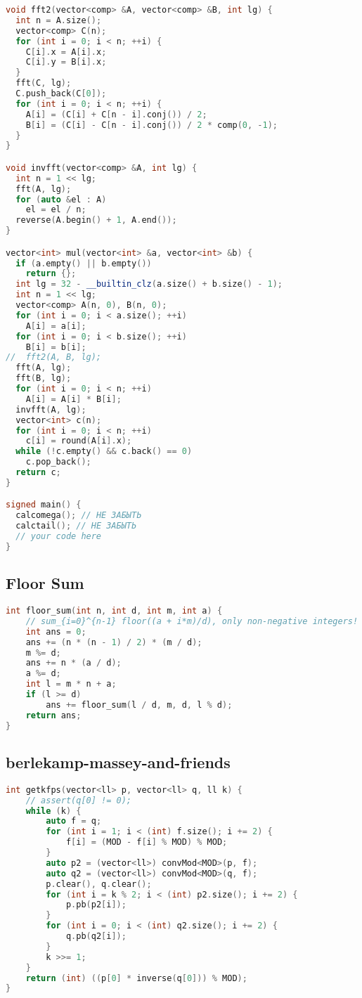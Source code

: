 \documentclass[9pt,a4paper,landscape,twosided]{extarticle}
\begin{document}
\begin{multicols*}{3}
\begin{lstlisting}[language=C++]
void fft2(vector<comp> &A, vector<comp> &B, int lg) {
  int n = A.size();
  vector<comp> C(n);
  for (int i = 0; i < n; ++i) {
    C[i].x = A[i].x;
    C[i].y = B[i].x;
  }
  fft(C, lg);
  C.push_back(C[0]);
  for (int i = 0; i < n; ++i) {
    A[i] = (C[i] + C[n - i].conj()) / 2;
    B[i] = (C[i] - C[n - i].conj()) / 2 * comp(0, -1);
  }
}

void invfft(vector<comp> &A, int lg) {
  int n = 1 << lg;
  fft(A, lg);
  for (auto &el : A)
    el = el / n;
  reverse(A.begin() + 1, A.end());
}

vector<int> mul(vector<int> &a, vector<int> &b) {
  if (a.empty() || b.empty())
    return {};
  int lg = 32 - __builtin_clz(a.size() + b.size() - 1);
  int n = 1 << lg;
  vector<comp> A(n, 0), B(n, 0);
  for (int i = 0; i < a.size(); ++i)
    A[i] = a[i];
  for (int i = 0; i < b.size(); ++i)
    B[i] = b[i];
//  fft2(A, B, lg);
  fft(A, lg);
  fft(B, lg);
  for (int i = 0; i < n; ++i)
    A[i] = A[i] * B[i];
  invfft(A, lg);
  vector<int> c(n);
  for (int i = 0; i < n; ++i)
    c[i] = round(A[i].x);
  while (!c.empty() && c.back() == 0)
    c.pop_back();
  return c;
}

signed main() {
  calcomega(); // НЕ ЗАБЫТЬ
  calctail(); // НЕ ЗАБЫТЬ
  // your code here
}

\end{lstlisting}

\subsection{Floor Sum}
\begin{lstlisting}[language=C++]
int floor_sum(int n, int d, int m, int a) {
    // sum_{i=0}^{n-1} floor((a + i*m)/d), only non-negative integers!
    int ans = 0;
    ans += (n * (n - 1) / 2) * (m / d);
    m %= d;
    ans += n * (a / d);
    a %= d;
    int l = m * n + a;
    if (l >= d)
        ans += floor_sum(l / d, m, d, l % d);
    return ans;
}
\end{lstlisting}

\subsection{berlekamp-massey-and-friends}
\begin{lstlisting}[language=C++]
int getkfps(vector<ll> p, vector<ll> q, ll k) {
    // assert(q[0] != 0);
    while (k) {
        auto f = q;
        for (int i = 1; i < (int) f.size(); i += 2) {
            f[i] = (MOD - f[i] % MOD) % MOD;
        }
        auto p2 = (vector<ll>) convMod<MOD>(p, f);
        auto q2 = (vector<ll>) convMod<MOD>(q, f);
        p.clear(), q.clear();
        for (int i = k % 2; i < (int) p2.size(); i += 2) {
            p.pb(p2[i]);
        }
        for (int i = 0; i < (int) q2.size(); i += 2) {
            q.pb(q2[i]);
        }
        k >>= 1;
    }
    return (int) ((p[0] * inverse(q[0])) % MOD);
}


\end{lstlisting}
\end{multicols*}
\end{document}
